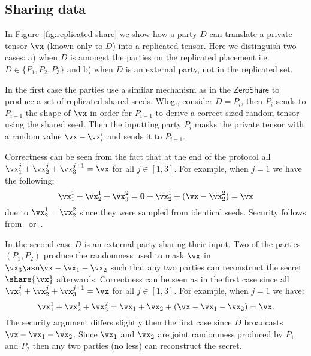 \subsection{Sharing data}

In Figure~\ref{fig:replicated-share} we show how a party $D$ can translate a
private tensor $\vx$ (known only to $D$) into a replicated tensor.
Here we distinguish two cases: a) when $D$ is amongst the parties on the replicated placement
i.e. $D \in \{P_1, P_2, P_3\}$ and b) when $D$ is an external party, not in the replicated set.

In the first case the parties use a similar mechanism as in the
$\mathsf{ZeroShare}$ to produce a set of replicated shared seeds. Wlog., consider $D=P_i$,
then $P_i$ sends to $P_{i-1}$ the shape of $\vx$ in order for $P_{i-1}$ to derive a correct
sized random tensor using the shared seed. Then the inputting party
$P_i$ masks the private tensor with a random value $\vx - \vx_i^i$ and sends it
to $P_{i+1}$.

Correctness can be seen from the fact that at the end of the protocol all
$\vx_1^j + \vx_2^j + \vx_3^{j+1} = \vx$ for all $j \in [1,3]$. For example, when
$j = 1$ we have the following: $$\vx_1^1 + \vx_2^1 + \vx_3^2 = \mathbf{0} +
\vx_2^1 + (\vx - \vx_2^2) = \vx $$ due to $\vx_2^1 = \vx_2^2$ since they were
sampled from identical seeds. Security follows from~\cite{CCS:ABFLNO16}
or~\cite{CCS:MohRin18}.


In the second case $D$ is an external party sharing their input. Two of the
parties $(P_1, P_2)$ produce the randomness used to mask $\vx$ in $\vx_3 \asn
\vx - \vx_1 - \vx_2$ such that any two parties can reconstruct the secret
$\share{\vx}$ afterwards. Correctness can be seen as in the first case since all
$\vx_1^j + \vx_2^j + \vx_3^{j+1} = \vx$ for all $j \in [1,3]$. For example, when
$j = 1$ we have: $$ \vx_1^1 + \vx_2^1 + \vx_3^2 = \vx_1 + \vx_2 + (\vx - \vx_1 -
\vx_2) = \vx.$$ The security argument differs slightly then the first case since
$D$ broadcasts $\vx - \vx_1 - \vx_2$. Since $\vx_1$ and $\vx_2$ are joint
randomness produced by $P_1$ and $P_2$ then any two parties (no less) can reconstruct the
secret.


